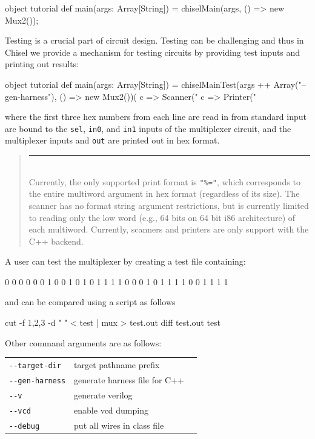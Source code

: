 \documentclass[10pt]{article}
\newenvironment{commentary}
{ \vspace{-0.1in}
  \begin{quotation}
  \noindent
  \small \em
  \rule{\linewidth}{1pt}\\
}
{
  \end{quotation}
}
\begin{document}
\begin{scala}
object tutorial {
  def main(args: Array[String]) = {
    chiselMain(args, () => new Mux2());
  }
}
\end{scala}

Testing is a crucial part of circuit design.
Testing can be challenging and thus in Chisel we provide a mechanism for
testing circuits by providing test inputs and printing out results:
\begin{scala}
object tutorial {
  def main(args: Array[String]) = {
    chiselMainTest(args ++ Array("--gen-harness"), 
                   () => new Mux2())(
      c => Scanner("%
      c => Printer("%
  }
}
\end{scala}

\noindent
where the first three hex numbers from each line are read in from
standard input are bound to the \verb+sel+, \verb+in0+,  and
\verb+in1+ inputs of the multiplexer circuit, and the multiplexer
inputs and \verb+out+ are printed out in hex format.  
\begin{commentary}
Currently, the only supported print format is \verb!"%="!,
which corresponds to the entire multiword argument in hex format
(regardless of its size).
The scanner has no format string argument restrictions, 
but is currently limited to reading only the low word (e.g., 64 bits
on 64 bit i86 architecture) of each multiword.
Currently, scanners and printers are only support with the C++ backend.
\end{commentary}
A user can test the multiplexer by creating a test file containing:
\begin{scala}
0 0 0 0
0 0 1 0
0 1 0 1
0 1 1 1
1 0 0 0
1 0 1 1
1 1 0 0
1 1 1 1
\end{scala}

\noindent
and can be compared using a script as follows

\begin{scala}
cut -f 1,2,3 -d " " < test | mux > test.out
diff test.out test
\end{scala}

Other command arguments are as follows:
\begin{tabular}{lll}
\verb+--target-dir+ & target pathname prefix \\
\verb+--gen-harness+ & generate harness file for C++ \\
\verb+--v+ & generate verilog \\
\verb+--vcd+ & enable vcd dumping \\
\verb+--debug+ & put all wires in class file \\
\end{tabular}
\end{document}
